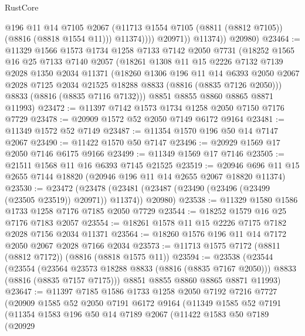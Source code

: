 \begin{lexlean}{RustCore}
\begin{coremodule}
                      @196
                      @11
                      @14
                      @7105
                      @2067
                      (@11713 @1554 @7105 (@8811 (@8812 @7105)) (@8816 (@8818 @1554 @11)))
                      @11374))))
              @20971))
          @11374))
      @20980)
@23464 := @11329
    @1566
    @1573
    @1734
    @1258
    @7133
    @7142
    @2050
    @7731
    (@18252
      @1565
      @16
      @25
      @7133
      @7140
      @2057
      (@18261
        @1308
        @11
        @15
        @2226
        @7132
        @7139
        @2028
        @1350
        @2034
        @11371
        (@18260
          @1306
          @196
          @11
          @14
          @6393
          @2050
          @2067
          @2028
          @7125
          @2034
          @21525
          @18288
          @8833
          (@8816 (@8835 @7126 @2050)))
        @8833
        (@8816 (@8835 @7116 @7132)))
      @8851
      @8855
      @8860
      @8865
      @8871
      @11993)
@23472 := @11397 @7142 @1573 @1734 @1258 @2050 @7150 @7176 @7729
@23478 := @20909 @1572 @52 @2050 @7149 @6172 @9164
@23481 := @11349 @1572 @52 @7149
@23487 := @11354 @1570 @196 @50 @14 @7147 @2067
@23490 := @11422 @1570 @50 @7147
@23496 := @20929 @1569 @17 @2050 @7146 @6175 @9166
@23499 := @11349 @1569 @17 @7146
@23505 := @21511 @1568 @11 @16 @6393 @7145 @21525
@23519 := @20946 @696 @11 @15 @2655 @7144 @18820 (@20946 @196 @11 @14 @2655 @2067 @18820 @11374)
@23530 := @23472
    (@23478 (@23481 (@23487 (@23490 (@23496 (@23499 (@23505 @23519)) @20971)) @11374)) @20980)
@23538 := @11329 @1580 @1586 @1733 @1258 @7176 @7185 @2050 @7729
@23544 := @18252 @1579 @16 @25 @7176 @7183 @2057
@23554 := @18261 @1578 @11 @15 @2226 @7175 @7182 @2028 @7156 @2034 @11371
@23564 := @18260 @1576 @196 @11 @14 @7172 @2050 @2067 @2028 @7166 @2034
@23573 := @11713 @1575 @7172 (@8811 (@8812 @7172)) (@8816 (@8818 @1575 @11))
@23594 := @23538
    (@23544
      (@23554
        (@23564 @23573 @18288 @8833 (@8816 (@8835 @7167 @2050)))
        @8833
        (@8816 (@8835 @7157 @7175)))
      @8851
      @8855
      @8860
      @8865
      @8871
      @11993)
@23647 := @11397
    @7185
    @1586
    @1733
    @1258
    @2050
    @7192
    @7216
    @7727
    (@20909
      @1585
      @52
      @2050
      @7191
      @6172
      @9164
      (@11349
        @1585
        @52
        @7191
        (@11354
          @1583
          @196
          @50
          @14
          @7189
          @2067
          (@11422
            @1583
            @50
            @7189
            (@20929

\end{coremodule}
\end{lexlean}
